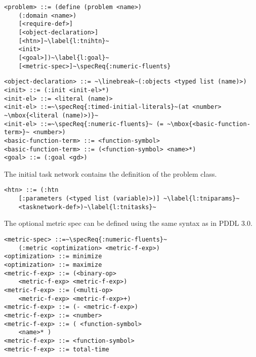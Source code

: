 \documentclass{article}
\begin{document}
\begin{lstlisting}[firstnumber=last, escapechar=~]
<problem> ::= (define (problem <name>)
    (:domain <name>)
    [<require-def>]
    [<object-declaration>]
    [<htn>]~\label{l:tnihtn}~
    <init>
    [<goal>])~\label{l:goal}~
    [<metric-spec>]~\specReq{:numeric-fluents}
\end{lstlisting}

\begin{lstlisting}[firstnumber=last, escapechar=~]
<object-declaration> ::= ~\linebreak~(:objects <typed list (name)>)
<init> ::= (:init <init-el>*)
<init-el> ::= <literal (name)>
<init-el> ::=~\specReq{:timed-initial-literals}~(at <number> ~\mbox{<literal (name)>)}~
<init-el> ::=~\specReq{:numeric-fluents}~ (= ~\mbox{<basic-function-term>}~ <number>)
<basic-function-term> ::= <function-symbol>
<basic-function-term> ::= (<function-symbol> <name>*)
<goal> ::= (:goal <gd>)
\end{lstlisting}

The initial task network contains the definition of the problem class.

\begin{lstlisting}[firstnumber=last, escapechar=~]
<htn> ::= (:htn 
    [:parameters (<typed list (variable)>)] ~\label{l:tniparams}~
    <tasknetwork-def>)~\label{l:tnitasks}~
\end{lstlisting} %

%
%

The optional metric spec can be defined using the same syntax as in PDDL 3.0.

\begin{lstlisting}[firstnumber=last, escapechar=~]
<metric-spec> ::=~\specReq{:numeric-fluents}~ 
    (:metric <optimization> <metric-f-exp>)
<optimization> ::= minimize
<optimization> ::= maximize
<metric-f-exp> ::= (<binary-op>
    <metric-f-exp> <metric-f-exp>)
<metric-f-exp> ::= (<multi-op> 
    <metric-f-exp> <metric-f-exp>+)
<metric-f-exp> ::= (- <metric-f-exp>)
<metric-f-exp> ::= <number>
<metric-f-exp> ::= ( <function-symbol> 
    <name>* )
<metric-f-exp> ::= <function-symbol>
<metric-f-exp> ::= total-time
\end{lstlisting}



\end{document}
